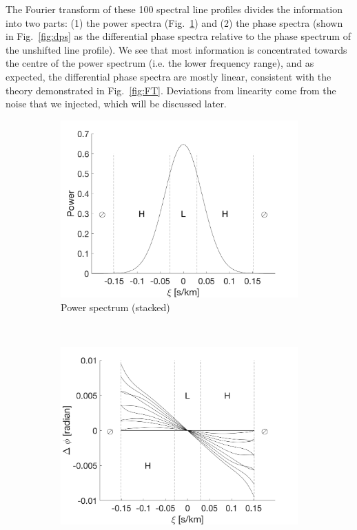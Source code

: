 The Fourier transform of these 100 spectral line profiles divides the information into two parts: (1) the power spectra (Fig.~\ref{fig:power_spectrum}) and (2) the phase spectra (shown in Fig.~\ref{fig:dps} as the differential phase spectra relative to the phase spectrum of the unshifted line profile). We see that most information is concentrated towards the centre of the power spectrum (i.e. the lower frequency range), and as expected, the differential phase spectra are mostly linear, consistent with the theory demonstrated in Fig.~\ref{fig:FT}. Deviations from linearity come from the noise that we injected, which will be discussed later. 

\begin{figure}[tbp]	
    \begin{subfigure}[b]{0.49\textwidth}
        \includegraphics[width=\textwidth]{./Figures/Methods/2-FT_power.png}
        \caption{Power spectrum (stacked)}
        \label{fig:power_spectrum}
    \end{subfigure}
	~
    \begin{subfigure}[b]{0.49\textwidth}
        \includegraphics[width=\textwidth]{./Figures/Methods/4-Relative_phase_angle.png}

\end{subfigure}
\end{figure}
